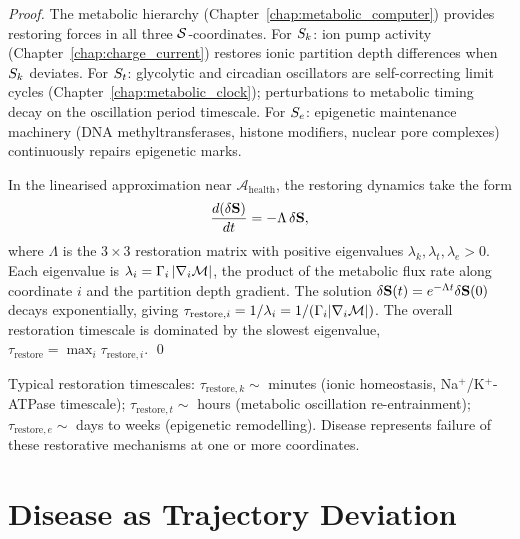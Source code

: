 \begin{proof}
The metabolic hierarchy (Chapter~\ref{chap:metabolic_computer}) provides
restoring forces in all three $\mathcal{S}$-coordinates. For $S_k$: ion pump
activity (Chapter~\ref{chap:charge_current}) restores ionic partition depth
differences when $S_k$ deviates. For $S_t$: glycolytic and circadian
oscillators are self-correcting limit cycles (Chapter~\ref{chap:metabolic_clock});
perturbations to metabolic timing decay on the oscillation period timescale.
For $S_e$: epigenetic maintenance machinery (DNA methyltransferases, histone
modifiers, nuclear pore complexes) continuously repairs epigenetic marks.

In the linearised approximation near $\mathcal{A}_{\mathrm{health}}$, the
restoring dynamics take the form
\begin{equation}
  \frac{d(\delta\mathbf{S})}{dt} = -\Lambda\,\delta\mathbf{S},
  \label{eq:restoring_dynamics}
\end{equation}
where $\Lambda$ is the $3\times 3$ restoration matrix with positive eigenvalues
$\lambda_k,\lambda_t,\lambda_e > 0$. Each eigenvalue is
$\lambda_i = \Gamma_i\,|\nabla_i\mathcal{M}|$, the product of the metabolic flux
rate along coordinate $i$ and the partition depth gradient. The solution
$\delta\mathbf{S}(t) = e^{-\Lambda t}\delta\mathbf{S}(0)$ decays exponentially,
giving $\tau_{\mathrm{restore},i} = 1/\lambda_i = 1/(\Gamma_i|\nabla_i\mathcal{M}|)$.
The overall restoration timescale is dominated by the slowest eigenvalue,
$\tau_{\mathrm{restore}} = \max_i\tau_{\mathrm{restore},i}$. \qed
\end{proof}

\begin{remark}
Typical restoration timescales: $\tau_{\mathrm{restore},k} \sim$ minutes
(ionic homeostasis, Na$^+$/K$^+$-ATPase timescale); $\tau_{\mathrm{restore},t}
\sim$ hours (metabolic oscillation re-entrainment); $\tau_{\mathrm{restore},e}
\sim$ days to weeks (epigenetic remodelling). Disease represents failure of
these restorative mechanisms at one or more coordinates.
\end{remark}

\section{Disease as Trajectory Deviation}
\label{sec:disease_deviation}

